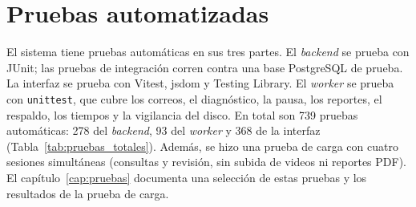 \section{Pruebas automatizadas}

El sistema tiene pruebas automáticas en sus tres partes. El \textit{backend} se prueba con JUnit; las pruebas de
integración corren contra una base PostgreSQL de prueba. La interfaz se prueba con Vitest, jsdom y Testing
Library. El \textit{worker} se prueba con \texttt{unittest}, que cubre los correos, el diagnóstico, la pausa, los
reportes, el respaldo, los tiempos y la vigilancia del disco. En total son 739 pruebas automáticas: 278 del
\textit{backend}, 93 del \textit{worker} y 368 de la interfaz (Tabla~\ref{tab:pruebas_totales}). Además, se hizo una prueba de carga con cuatro sesiones simultáneas (consultas y revisión, sin subida de videos ni
reportes PDF). El capítulo~\ref{cap:pruebas} documenta una selección de estas pruebas y los resultados de la prueba de carga.
